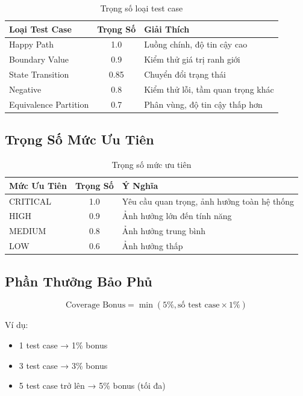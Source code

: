\documentclass[12pt, a4paper]{article}
\begin{document}
\begin{table}[h]
\centering
\begin{tabular}{|l|c|p{6cm}|}
\hline
\textbf{Loại Test Case} & \textbf{Trọng Số} & \textbf{Giải Thích} \\
\hline
Happy Path & 1.0 & Luồng chính, độ tin cậy cao \\
Boundary Value & 0.9 & Kiểm thử giá trị ranh giới \\
State Transition & 0.85 & Chuyển đổi trạng thái \\
Negative & 0.8 & Kiểm thử lỗi, tầm quan trọng khác \\
Equivalence Partition & 0.7 & Phân vùng, độ tin cậy thấp hơn \\
\hline
\end{tabular}
\caption{Trọng số loại test case}
\end{table}

\subsection{Trọng Số Mức Ưu Tiên}

\begin{table}[h]
\centering
\begin{tabular}{|l|c|p{6cm}|}
\hline
\textbf{Mức Ưu Tiên} & \textbf{Trọng Số} & \textbf{Ý Nghĩa} \\
\hline
CRITICAL & 1.0 & Yêu cầu quan trọng, ảnh hưởng toàn hệ thống \\
HIGH & 0.9 & Ảnh hưởng lớn đến tính năng \\
MEDIUM & 0.8 & Ảnh hưởng trung bình \\
LOW & 0.6 & Ảnh hưởng thấp \\
\hline
\end{tabular}
\caption{Trọng số mức ưu tiên}
\end{table}

\subsection{Phần Thưởng Bảo Phủ}

\begin{equation}
\text{Coverage Bonus} = \min(5\%, \text{số test case} \times 1\%)
\end{equation}

Ví dụ:
\begin{itemize}
    \item 1 test case → 1\% bonus
    \item 3 test case → 3\% bonus
    \item 5 test case trở lên → 5\% bonus (tối đa)
\end{itemize}
\end{document}
